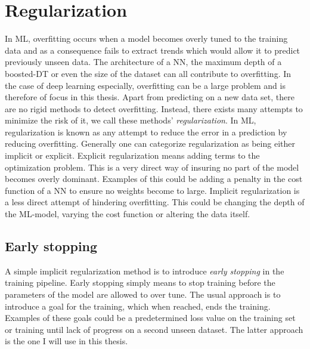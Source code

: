 \section{Regularization}
In \ac{ML}, overfitting occurs when a model becomes overly tuned to the training data and as a consequence 
fails to extract trends which would allow it to predict previously unseen data. The architecture of a \ac{NN}, 
the maximum depth of a boosted-\ac{DT} or even the size of the dataset can all contribute to overfitting. In the 
case of deep learning especially, overfitting can be a large problem and is therefore of focus in this thesis. Apart 
from predicting on a new data set, there are no rigid methods to detect overfitting. Instead, there exists many 
attempts to minimize the risk of it, we call these methods' \emph{regularization}. In \ac{ML}, regularization 
is known as any attempt to reduce the error in a prediction by reducing overfitting. Generally one can categorize
regularization as being either implicit or explicit. Explicit regularization means adding terms to the optimization 
problem. This is a very direct way of insuring no part of the model becomes overly dominant. Examples of this 
could be adding a penalty in the cost function of a \ac{NN} to ensure no weights become to large. Implicit
regularization is a less direct attempt of hindering overfitting. This could be changing the depth of the \ac{ML}-model,
varying the cost function or altering the data itself.
\subsection{Early stopping}
A simple implicit regularization method is to introduce \emph{early stopping} in the training pipeline. Early stopping 
simply means to stop training before the parameters of the model are allowed to over tune. The usual approach 
is to introduce a goal for the training, which when reached, ends the training. Examples of these goals could be a 
predetermined loss value on the training set or training until lack of progress on a second unseen dataset. The latter
approach is the one I will use in this thesis. 
